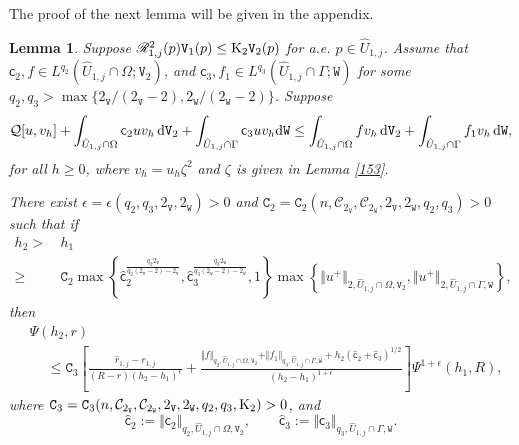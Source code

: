 \documentclass[reqno, 11pt, a4paper]{amsart}
\newtheorem{lemma}[theorem]{Lemma}
\numberwithin{equation}{section}
\newcommand{\ops}{\mathcal{Q}}
\newcommand{\xv}{2_{\mathtt{V}}}
\newcommand{\xw}{2_{\mathtt{W}}}
\newcommand{\ck}{\textnormal K}
\newcommand{\fc}{\mathsf c}
\newcommand{\wghtv}{\mathtt{V}}
\newcommand{\wghtw}{\mathtt{W}}
\newcommand{\dwv}{\textnormal{d} \mathtt{V}}
\newcommand{\dww}{\textnormal{d} \mathtt{W}}
\newcommand{\kp}{\mathscr{R}}
\newcommand{\pvr}{p}
\newcommand{\qxp}{q}
\newcommand{\cen}{\mathtt{C}}
\begin{document}
The proof of the next lemma will be given in the appendix.
\begin{lemma} \label{alcontb0}
Suppose $\kp _{1 , j} ^{2 } (\pvr) \wghtv _1 (\pvr )  \leq \ck _{2} \wghtv _2 (\pvr )$ for   a.e. $\pvr  \in \hat U _{1,j}$. Assume that   $\fc _2, f \in L^{q_2} (\hat U _{1,j} \cap \Omega  ; \wghtv _2)$,  and  $\fc _3 , f_1 \in L^{q_3} (\hat U _{1,j} \cap \Gamma ; \wghtw)$  for some  $q _2, q_3 > \max \{ \xv / (\xv -2) , \xw / (\xw -2) \}$. Suppose  
\begin{equation}\label{a168}
\begin{aligned}
 \ops [u,v_{h} ] + \int  _{\hat U _{1,j} \cap \Omega } \fc _2 u v_{h}   \, \dwv _{2}   + \int  _{ \hat U _{1,j} \cap \Gamma} \fc _3 u v_{ h } \dww  
 \leq \int  _{\hat U _{1,j} \cap \Omega }    f v_{ h } \, \dwv _{2}  + \int_{\hat U _{1,j} \cap \Gamma }  f_1 v _{ h } \, \dww ,  
\end{aligned}
\end{equation}
for all $h\geq 0 $, where $v _{ h }  = u_{ h }  \zeta ^2 $ and $\zeta$ is given in Lemma \ref{153}.    


There exist  $\epsilon  = \epsilon ( q_2 , q_3 , \xv , \xw ) >0$ and  $\cen _2 = \cen _2 (  n , \mathcal C_{\xv} , \mathcal C_{\xw} , \xv , \xw , \qxp _2 , \qxp _3) >0$  such that if  
\begin{align*}
h_{2} > & \displaystyle \, h_{1}  \\[3pt]
  \geq & \displaystyle \,  \cen _2 \max \left\{ \widehat{\fc}_2 ^{\frac{\qxp _2 \xv }{\qxp _2 (\xv -2) - \xv}}   , \widehat{\fc}_3 ^{\frac{\qxp _3 \xw }{\qxp _3 (\xw -2) - \xw}} , 1\right\}  \max \left\{ \Vert u^+ \Vert _{2 , \hat U _{1,j} \cap \Omega  , \wghtv _2}  ,   \Vert  u^+ \Vert _{2 , \hat U _{1,j} \cap \Gamma , \wghtw }  \right\}, 
\end{align*}
then 
\begin{equation} \label{48}
\begin{aligned}
&\Psi  (h_{2},r) \\[3pt]
&\quad \ \leq \cen _3 \left[   \frac{  \hat r_{1,j}  - r_{1,j} }{(R-r)(h_{2}-h_{1} )^{\epsilon }}  + \frac{ \Vert f \Vert _{ q_2 ,  \hat U _{1,j} \cap \Omega  , \wghtv _2}  + \Vert f_1 \Vert _{q_3 , \hat U _{1,j} \cap \Gamma , \wghtw} + h_{2} (\widehat{\fc}_2 + \widehat{\fc}_3)^{1/2}}{(h_{2}-h_{1} )^{1+\epsilon }}\right] \Psi ^{1 + \epsilon  } (h_{1} ,R),
\end{aligned}
\end{equation}
where  $\cen _3= \cen _3  (  n , \mathcal C_{\xv} , \mathcal C_{\xw} ,  \xv , \xw , \qxp _2 , \qxp _3 , \ck _2) >0$, and
$$
\widehat{\fc}_2 :=\Vert \fc _2 \Vert _{q_2 , \hat U _{1,j} \cap \Omega  , \wghtv _2 } ,\qquad \widehat{\fc}_3 :=\Vert \fc _3 \Vert _{q_3 , \hat U _{1,j} \cap \Gamma  , \wghtw } .
$$

\end{lemma}
\end{document}
